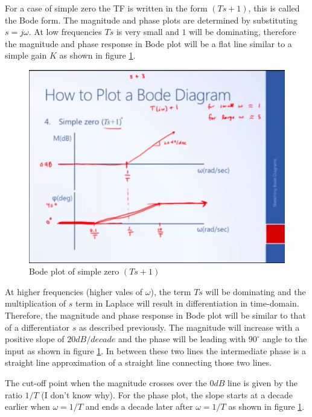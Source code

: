 For a case of simple zero the TF is written in the form $(Ts+1)$, this is called the Bode form. The magnitude and phase plots are determined by substituting $s = j \omega$. At low frequencies $Ts$ is very small and $1$ will be dominating, therefore the magnitude and phase response in Bode plot will be a flat line similar to a simple gain $K$ as shown in figure \ref{Fig_FreqResp_BodePlot_zero}.
\begin{figure}[h!]
	\centering
	\includegraphics[width=\linewidth]{Bilder/FreqResp_BodePlot_zero}
	\caption{Bode plot of simple zero $(Ts + 1)$}
	\label{Fig_FreqResp_BodePlot_zero}
\end{figure}
At higher frequencies (higher vales of $\omega$), the term $Ts$ will be dominating and the multiplication of $s$ term in Laplace will result in differentiation in time-domain. Therefore, the magnitude and phase response in Bode plot will be similar to that of a differentiator $s$ as described previously. The magnitude will increase with a positive slope of $20 dB/decade$ and the phase will be leading with $90^{\circ}$ angle to the input as shown in figure \ref{Fig_FreqResp_BodePlot_zero}. In between these two lines the intermediate phase is a straight line approximation of a straight line connecting those two lines.

The cut-off point when the magnitude crosses over the $0 dB$ line is given by the ratio $1/T$ (I don't know why). For the phase plot, the slope starts at a decade earlier when $\omega = 1/T$ and ends a decade later after $\omega = 1/T$ as shown in figure \ref{Fig_FreqResp_BodePlot_zero}. 

